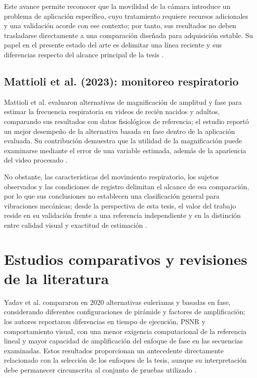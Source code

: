 Este avance permite reconocer que la movilidad de la cámara introduce un problema de aplicación específico, cuyo tratamiento requiere recursos adicionales y una validación acorde con ese contexto; por tanto, sus resultados no deben trasladarse directamente a una comparación diseñada para adquisición estable. Su papel en el presente estado del arte es delimitar una línea reciente y sus diferencias respecto del alcance principal de la tesis \cite{zang2026phase}.

\subsection{Mattioli et al. (2023): monitoreo respiratorio}

Mattioli et al. evaluaron alternativas de magnificación de amplitud y fase para estimar la frecuencia respiratoria en videos de recién nacidos y adultos, comparando sus resultados con datos fisiológicos de referencia; el estudio reportó un mejor desempeño de la alternativa basada en fase dentro de la aplicación evaluada. Su contribución demuestra que la utilidad de la magnificación puede examinarse mediante el error de una variable estimada, además de la apariencia del video procesado \cite{mattioli2023breathing}.

No obstante, las características del movimiento respiratorio, los sujetos observados y las condiciones de registro delimitan el alcance de esa comparación, por lo que sus conclusiones no establecen una clasificación general para vibraciones mecánicas; desde la perspectiva de esta tesis, el valor del trabajo reside en su validación frente a una referencia independiente y en la distinción entre calidad visual y exactitud de estimación \cite{mattioli2023breathing}.

\section{Estudios comparativos y revisiones de la literatura}

Yadav et al. compararon en 2020 alternativas eulerianas y basadas en fase, considerando diferentes configuraciones de pirámide y factores de amplificación; los autores reportaron diferencias en tiempo de ejecución, \gls{PSNR} y comportamiento visual, con una menor exigencia computacional de la referencia lineal y mayor capacidad de amplificación del enfoque de fase en las secuencias examinadas. Estos resultados proporcionan un antecedente directamente relacionado con la selección de los enfoques de la tesis, aunque su interpretación debe permanecer circunscrita al conjunto de pruebas utilizado \cite{yadav2020performance}.

